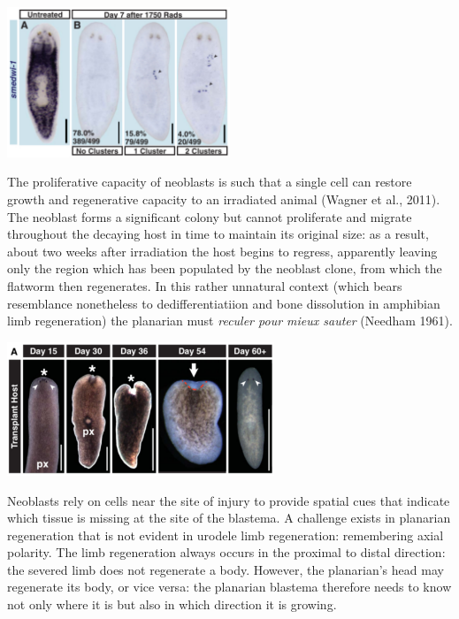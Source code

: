 \documentclass{article}
\begin{document}
\begin{center}
\includegraphics[width=0.5\textwidth]{neoblast.pdf}
\end{center}

The proliferative capacity of neoblasts is such that a single cell can restore growth and regenerative capacity to an irradiated animal (Wagner et al., 2011). The neoblast forms a significant colony but cannot proliferate and migrate throughout the decaying host in time to maintain its original size: as a result, about two weeks after irradiation the host begins to regress, apparently leaving only the region which has been populated by the neoblast clone, from which the flatworm then regenerates. In this rather unnatural context (which bears resemblance nonetheless to dedifferentiatiion and bone dissolution in amphibian limb regeneration) the planarian must \textit{reculer pour mieux sauter} (Needham 1961).

\begin{center}
\includegraphics[width=0.6\textwidth]{regression.pdf}
\end{center}

Neoblasts rely on cells near the site of injury to provide spatial cues that indicate which tissue is missing at the site of the blastema. A challenge exists in planarian regeneration that is not evident in urodele limb regeneration: remembering axial polarity. The limb regeneration always occurs in the proximal to distal direction: the severed limb does not regenerate a body. However, the planarian's head may regenerate its body, or vice versa: the planarian blastema therefore needs to know not only where it is but also in which direction it is growing.
\end{document}
